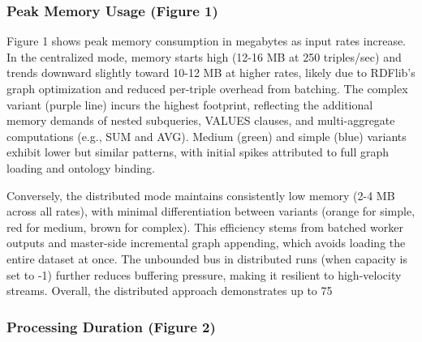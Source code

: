 \documentclass[5p,times]{elsarticle}
\begin{document}
    \subsubsection{Peak Memory Usage (Figure 1)}

    Figure 1 shows peak memory consumption in megabytes as input rates
     increase. In the centralized mode, memory starts high 
     (12-16 MB at 250 triples/sec) and trends downward slightly toward 
     10-12 MB at higher rates, likely due to RDFlib's graph optimization and reduced per-triple overhead from batching. The complex variant (purple line) incurs the highest footprint, reflecting the additional memory demands of nested subqueries, VALUES clauses, and multi-aggregate computations (e.g., SUM and AVG). Medium (green) and simple (blue) variants exhibit lower but similar patterns, with initial spikes attributed to full graph loading and ontology binding.

    Conversely, the distributed mode maintains consistently low memory
    (2-4 MB across all rates), with minimal differentiation between variants (orange for simple, red for medium, brown for complex). This efficiency stems from batched worker outputs and master-side incremental graph appending, which avoids loading the entire dataset at once. The unbounded bus in distributed runs (when capacity is set to -1) further reduces buffering pressure, making it resilient to high-velocity streams. Overall, the distributed approach demonstrates up to 75%

    \subsubsection{Processing Duration (Figure 2)}
\end{document}
